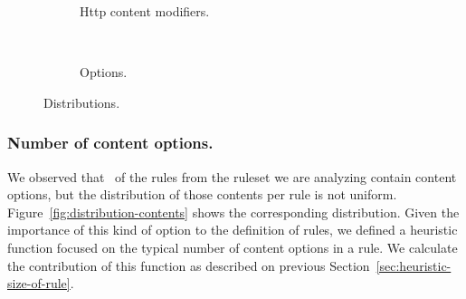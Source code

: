 \documentclass[sigconf,review, anonymous]{acmart}
\begin{document}
\begin{figure}[t!]
\begin{subfigure}{.25\textwidth}
{\begin{tikzpicture}
    \end{tikzpicture}
  }
  \vspace{-2ex}
  \caption{\label{fig:distribution-content_modifiers}Http content modifiers.}
\end{subfigure}%
\\
\begin{subfigure}{.2\textwidth}
  \centering
  \vspace{-5ex}      
  \caption{\label{fig:distribution-options}Options.}
\end{subfigure}%
\vspace{-1ex}
\caption{Distributions.}
\end{figure}



\subsubsection{Number of content options.} We observed
that \percContentOptions\ of the rules from the ruleset we are
analyzing contain content options, but the distribution of those
contents per rule is not uniform. Figure~\ref{fig:distribution-contents} shows the
corresponding distribution. Given the importance of this kind of
option to the definition of rules, we defined a heuristic function
focused on the typical number of content options in a rule. We
calculate the contribution of this function as described on previous
Section~\ref{sec:heuristic-size-of-rule}. 
\end{document}
